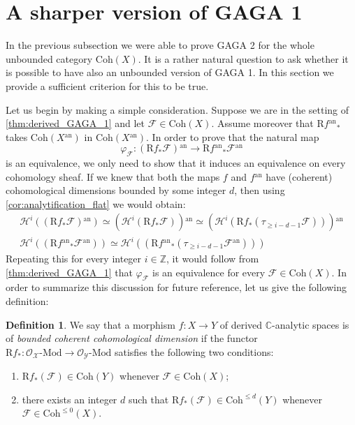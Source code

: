 \documentclass[12pt,a4paper,reqno]{amsart}
\theoremstyle{plain}
\theoremstyle{definition}
\newtheorem{defin}[thm]{Definition}
\theoremstyle{remark}
\numberwithin{equation}{section}
\begin{document}
\section{A sharper version of GAGA 1}

In the previous subsection we were able to prove GAGA 2 for the whole unbounded category ${\mathrm{Coh}}(X)$.
It is a rather natural question to ask whether it is possible to have also an unbounded version of GAGA 1.
In this section we provide a sufficient criterion for this to be true.

Let us begin by making a simple consideration. Suppose we are in the setting of \cref{thm:derived_GAGA_1} and let ${\mathcal F} \in {\mathrm{Coh}}(X)$. Assume moreover that ${\mathrm R} f{^\mathrm{an}}_*$ takes ${\mathrm{Coh}}(X{^\mathrm{an}})$ in ${\mathrm{Coh}}(X{^\mathrm{an}})$. In order to prove that the natural map
\[ \varphi_{\mathcal F} \colon ({\mathrm R} f_* {\mathcal F}){^\mathrm{an}} \to {\mathrm R} f{^\mathrm{an}}_* {\mathcal F}{^\mathrm{an}} \]
is an equivalence, we only need to show that it induces an equivalence on every cohomology sheaf.
If we knew that both the maps $f$ and $f{^\mathrm{an}}$ have (coherent) cohomological dimensions bounded by some integer $d$, then using \cref{cor:analytification_flat} we would obtain:
\begin{gather*}
{\mathcal H}^i(({\mathrm R} f_* {\mathcal F}){^\mathrm{an}}) \simeq ({\mathcal H}^i({\mathrm R} f_* {\mathcal F})){^\mathrm{an}} \simeq ({\mathcal H}^i( {\mathrm R} f_* ( \tau_{\ge i - d - 1} {\mathcal F} ) )){^\mathrm{an}} \\
{\mathcal H}^i( ({\mathrm R} f{^\mathrm{an}}_* {\mathcal F}{^\mathrm{an}}) ) \simeq {\mathcal H}^i( ( {\mathrm R} f{^\mathrm{an}}_* ( \tau_{\ge i - d - 1} {\mathcal F}{^\mathrm{an}} ) ))
\end{gather*}
Repeating this for every integer $i \in \mathbb Z$, it would follow from \cref{thm:derived_GAGA_1} that $\varphi_{\mathcal F}$ is an equivalence for every ${\mathcal F} \in {\mathrm{Coh}}(X)$.
In order to summarize this discussion for future reference, let us give the following definition:

\begin{defin}
	We say that a morphism $f \colon X \to Y$ of derived {$\mathbb C$-analytic\xspace} spaces is of \emph{bounded coherent cohomological dimension} if the functor ${\mathrm R} f_* \colon {\mathcal O}_{\mathcal X} \textrm{-} {\mathrm{Mod}} \to {\mathcal O}_{\mathcal Y} \textrm{-} {\mathrm{Mod}}$ satisfies the following two conditions:
	\begin{enumerate}
		\item ${\mathrm R} f_*({\mathcal F}) \in {\mathrm{Coh}}(Y)$ whenever ${\mathcal F} \in {\mathrm{Coh}}(X)$;
		\item there exists an integer $d$ such that ${\mathrm R} f_*({\mathcal F}) \in {\mathrm{Coh}}^{\le d}(Y)$ whenever ${\mathcal F} \in {\mathrm{Coh}}^{\le 0}(X)$.
	\end{enumerate}
\end{defin}
\end{document}
